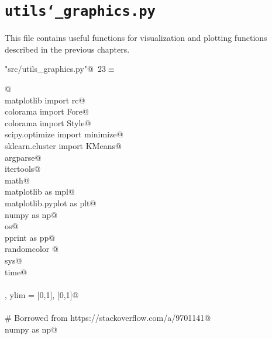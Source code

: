 \documentclass[10pt, english, oneside]{report}
\begin{document}
\begin{appendices}
\begin{flushleft}
\begin{list}{}{\setlength{\itemsep}{-\parsep}\setlength{\itemindent}{-\leftmargin}}
\item{}
\end{list}
\vspace{4ex}
\end{flushleft}
\chapter{\texttt{utils\char`_graphics.py}}

This file contains useful functions for visualization and plotting functions described in the previous chapters.
\begin{flushleft} \small\label{scrap23}\raggedright\small
{} \verb@"src/utils_graphics.py"@\nobreak\ {\footnotesize {23}}$\equiv$
\vspace{-1ex}
\begin{list}{}{} \item
\mbox{}\verb@    @\\
\mbox{}\verb@from matplotlib import rc@\\
\mbox{}\verb@from colorama import Fore@\\
\mbox{}\verb@from colorama import Style@\\
\mbox{}\verb@from scipy.optimize import minimize@\\
\mbox{}\verb@from sklearn.cluster import KMeans@\\
\mbox{}\verb@import argparse@\\
\mbox{}\verb@import itertools@\\
\mbox{}\verb@import math@\\
\mbox{}\verb@import matplotlib as mpl@\\
\mbox{}\verb@import matplotlib.pyplot as plt@\\
\mbox{}\verb@import numpy as np@\\
\mbox{}\verb@import os@\\
\mbox{}\verb@import pprint as pp@\\
\mbox{}\verb@import randomcolor @\\
\mbox{}\verb@import sys@\\
\mbox{}\verb@import time@\\
\mbox{}\verb@@\\
\mbox{}\verb@xlim, ylim = [0,1], [0,1]@\\
\mbox{}\verb@@\\
\mbox{}\verb@# Borrowed from https://stackoverflow.com/a/9701141@\\
\mbox{}\verb@import numpy as np@\\

\end{list}
\end{flushleft}
\end{appendices}
\end{document}
